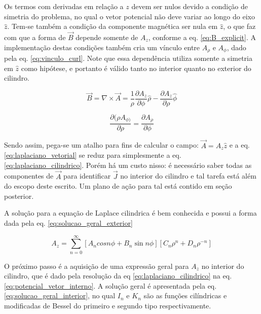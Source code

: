 \documentclass[%
 reprint,
 amsmath,amssymb,
 aps,
]{revtex4-1}
\begin{document}
Os termos com derivadas em relação a $z$ devem ser nulos devido a condição de simetria do problema, no qual o vetor potencial não deve variar ao longo do eixo $\hat{z}$. Tem-se também a condição da componente magnética ser nula em $\hat{z}$, o que faz com que a forma de $\vec{B}$ depende somente de $A_z$, conforme a eq. \ref{eq:B_explicit}. A implementação destas condições também cria um vínculo entre $A_{\rho}$ e $A_{\phi}$, dado pela eq. \ref{eq:vinculo_curl}. Note que essa dependência utiliza somente a simetria em $\hat{z}$ como hipótese, e portanto é válido tanto no interior quanto no exterior do cilindro.

\begin{equation}
    \label{eq:B_explicit}
        \vec{B} = \nabla \times \vec{A} = \frac{1}{\rho}\frac{\partial A_z}{\partial \phi}\hat{\rho} - \frac{\partial A_z}{\partial \rho} \hat{\phi}
\end{equation}

\begin{equation}
    \label{eq:vinculo_curl}
    \frac{\partial (\rho A_{\phi)}}{\partial {\rho}} = \frac{\partial A_{\rho}}{\partial \phi}
\end{equation}

Sendo assim, pega-se um atalho para fins de calcular o campo: $\vec{A} = A_z \hat{z}$ e a eq. \ref{eq:laplaciano_vetorial} se reduz para simplesmente a eq. \ref{eq:laplaciano_cilindrico}. Porém há um custo nisso: é necessário saber todas as componentes de $\vec{A}$ para identificar $\vec{J}$ no interior do cilindro e tal tarefa está além do escopo deste escrito. Um plano de ação para tal está contido em seção posterior.

A solução para a equação de Laplace cilindrica é bem conhecida e possui a forma dada pela eq. \ref{eq:solucao_geral_exterior}

\begin{equation}
    \label{eq:solucao_geral_exterior}
    A_z = \sum_{n=0}^{\infty}[A_n cos{n \phi} + B_n \sin{n \phi}] [C_n \rho^n + D_n \rho^{-n}]
\end{equation}

O próximo passo é a aquisição de uma expressão geral para $A_z$ no interior do cilindro, que é dado pela resolução da eq \ref{eq:laplaciano_cilindrico} na eq. \ref{eq:potencial_vetor_interno}. A solução geral é apresentada pela eq. \ref{eq:solucao_geral_interior}, no qual $I_n$ e $K_n$ são as funções cilíndricas e modificadas de Bessel do primeiro e segundo tipo respectivamente. \cite{original_article}
\end{document}

